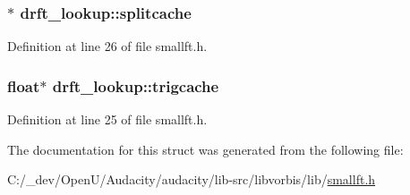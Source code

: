 \subsubsection[{\texorpdfstring{splitcache}{splitcache}}]{$\ast$ drft\+\_\+lookup\+::splitcache}\hypertarget{structdrft__lookup_ad0e2018119f00417ea11756c1f78fd7a}{}\label{structdrft__lookup_ad0e2018119f00417ea11756c1f78fd7a}


Definition at line 26 of file smallft.\+h.

\subsubsection[{\texorpdfstring{trigcache}{trigcache}}]{\setlength{\rightskip}{0pt plus 5cm}float$\ast$ drft\+\_\+lookup\+::trigcache}\hypertarget{structdrft__lookup_abadb842ed4e0b1b90b0d621acdf0ea4c}{}\label{structdrft__lookup_abadb842ed4e0b1b90b0d621acdf0ea4c}


Definition at line 25 of file smallft.\+h.



The documentation for this struct was generated from the following file\+:\begin{DoxyCompactItemize}
\item 
C\+:/\+\_\+dev/\+Open\+U/\+Audacity/audacity/lib-\/src/libvorbis/lib/\hyperlink{smallft_8h}{smallft.\+h}\end{DoxyCompactItemize}
